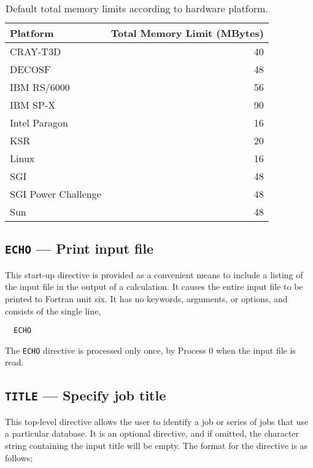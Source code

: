\begin{table}

\center

\label{tbl:default-memory-limits}

\begin{tabular}{lr}
\hline\hline
Platform        & Total Memory Limit (MBytes) \\
\hline
CRAY-T3D        & 40 \\
DECOSF          & 48 \\
IBM RS/6000     & 56 \\
IBM SP-X        & 90 \\
Intel Paragon   & 16 \\
KSR             & 20 \\
Linux           & 16 \\
SGI             & 48 \\
SGI Power Challenge  & 48 \\
Sun             & 48 \\
\hline\hline
\end{tabular}

\caption{Default total memory limits according to hardware platform.}


\end{table}

\subsection{{\tt ECHO} --- Print input file}
\label{sec:echo}

This start-up directive is provided as a convenient means to include a
listing of the input file in the output of a calculation.  It causes
the entire input file to be printed to Fortran unit six.  It has no
keywords, arguments, or options, and consists of the single line,

\begin{verbatim}
  ECHO
\end{verbatim}

The \verb+ECHO+ directive is processed only
once, by Process 0 when the input file is read.

\subsection{{\tt TITLE} --- Specify job title}

This top-level directive allows the user to identify a job or series of 
jobs that use a
particular database.  It is an optional directive, and if omitted, the 
character string containing the input title will be empty.  The format for 
the directive is as follows;


